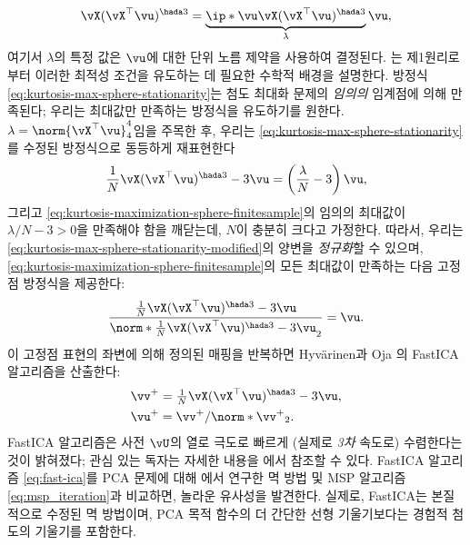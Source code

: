 \documentclass[../../book-main_ko.tex]{subfiles}
\begin{document}
\begin{align}\label{eq:kurtosis-max-sphere-stationarity}
   \vX (\vX^\top \vu)^{\hada 3}
   =
   \underbrace{
   \ip*{\vu}{
   \vX (\vX^\top \vu)^{\hada 3}
   }}_{\lambda} \vu,
\end{align}
여기서 \(\lambda\)의 특정 값은 \(\vu\)에 대한 단위 노름 제약을 사용하여 결정된다.
는 제1원리로부터 이러한 최적성 조건을 유도하는 데 필요한 수학적 배경을 설명한다.
방정식 \eqref{eq:kurtosis-max-sphere-stationarity}는 첨도 최대화 문제의 \textit{임의의} 임계점에 의해 만족된다; 우리는 최대값만 만족하는 방정식을 유도하기를 원한다.
\(\lambda = \norm{\vX^\top \vu}_4^4\)임을 주목한 후, 우리는 \eqref{eq:kurtosis-max-sphere-stationarity}를 수정된 방정식으로 동등하게 재표현한다
\begin{align}\label{eq:kurtosis-max-sphere-stationarity-modified}
   \frac{1}{N}\vX (\vX^\top \vu)^{\hada 3}
   -
   3 \vu
   =
   \left(
   \frac{\lambda}{N} - 3
   \right)
   \vu,
\end{align}
그리고 \eqref{eq:kurtosis-maximization-sphere-finitesample}의 임의의 최대값이 \(\lambda / N - 3 > 0\)을 만족해야 함을 깨닫는데,
\(N\)이 충분히 크다고 가정한다.
따라서, 우리는 \eqref{eq:kurtosis-max-sphere-stationarity-modified}의 양변을 \textit{정규화}할 수 있으며,
\eqref{eq:kurtosis-maximization-sphere-finitesample}의 모든 최대값이 만족하는 다음 고정점 방정식을 제공한다:
\begin{align}\label{eq:kurtosis-max-sphere-fxp}
\frac{
   \frac{1}{N}\vX (\vX^\top \vu)^{\hada 3}
   -
   3 \vu
   }{
   \norm*{
   \frac{1}{N}\vX (\vX^\top \vu)^{\hada 3}
   -
   3 \vu
   }_2
   }
   =
   \vu.
\end{align}
이 고정점 표현의 좌변에 의해 정의된 매핑을 반복하면 Hyv\"{a}rinen과 Oja \cite{hyvarinen-1997}의 FastICA 알고리즘을 산출한다:
\begin{equation}
\begin{split}\label{eq:fast-ica}
   \vv^+ &= \tfrac{1}{N}\vX (\vX^\top \vu)^{\hada 3}- 3 \vu
   ,  \\
   \vu^+ &= \vv^+ / \norm*{\vv^+}_2.
   \end{split}
\end{equation}
FastICA 알고리즘은 사전 \(\vU\)의 열로 극도로 빠르게 (실제로 \textit{3차} 속도로) 수렴한다는 것이 밝혀졌다; 관심 있는 독자는 자세한 내용을 \cite{hyvarinen-1997}에서 참조할 수 있다.
FastICA 알고리즘 \eqref{eq:fast-ica}를 PCA 문제에 대해 에서 연구한 멱 방법 및 MSP 알고리즘 \eqref{eq:msp_iteration}과 비교하면, 놀라운 유사성을 발견한다. 실제로, FastICA는 본질적으로 수정된 멱 방법이며, PCA 목적 함수의 더 간단한 선형 기울기보다는 경험적 첨도의 기울기를 포함한다.
\end{document}
